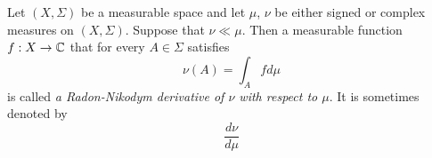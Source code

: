 \begin{definition}
Let $(X,\Sigma)$ be a measurable space and let $\mu$, $\nu$ be either signed or complex measures on $(X,\Sigma)$. Suppose that $\nu \ll \mu$. Then a measurable function $f:X\rightarrow {\mathbb C}$ that for every $A\in \Sigma$ satisfies
$$\nu(A) = \int_A f d\mu$$
is called \textit{a Radon-Nikodym derivative of $\nu$ with respect to $\mu$}. It is sometimes denoted by 
$$\frac{d\nu}{d\mu}$$
\end{definition}



























































































































\small



